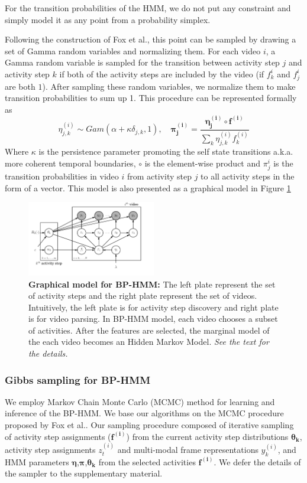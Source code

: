 For the transition probabilities of the HMM, we do not put any constraint and simply model it as any point from a probability simplex. 

Following the construction of Fox et al.\cite{foxBPHMM}, this point can be sampled by drawing a set of Gamma random variables and normalizing them. For each video $i$, a Gamma random variable is sampled for the transition between activity step $j$ and activity step $k$ if both of the activity steps are included by the video (\ie if $f^i_k$ and $f^i_j$ are both $1$). After sampling these random variables, we normalize them to make transition probabilities to sum up 1. This procedure can be represented formally as
\begin{equation}
  \eta_{j,k}^{(i)} \sim Gam(\alpha+\kappa \delta_{j,k},1), \quad \mathbf{\pi_j^{(i)}} = \frac{\mathbf{\eta^{(i)}_j} \circ \mathbf{f^{(i)}}}{\sum_k \eta^{(i)}_{j,k} f^{(i)}_k}
\end{equation}
Where $\kappa$ is the persistence parameter promoting the self state transitions a.k.a. more coherent temporal boundaries, $\circ$ is the element-wise product and $\pi^i_j$ is the transition probabilities in video $i$ from activity step $j$ to all activity steps in the form of a vector. This model is also presented as a graphical model in Figure \ref{bphmmo}
\begin{figure}[h!]
  \includegraphics[width=0.5\textwidth]{plate}
  \vspace{-8mm}
  \caption{\textbf{Graphical model for BP-HMM:} The left plate represent the set of activity steps and the right plate represent the set of videos. Intuitively, the left plate is for activity step discovery and right plate is for video parsing. In BP-HMM model, each video chooses a subset of activities. After the features are selected, the marginal model of the each video becomes an Hidden Markov Model. \emph{See the text for the details.}}
  \label{bphmmo}
\end{figure}


\subsubsection{Gibbs sampling for BP-HMM}
We employ Markov Chain Monte Carlo (MCMC) method for learning and inference of the BP-HMM. We base our algorithms on the MCMC procedure proposed by Fox et al.\cite{foxBPHMM}. Our sampling procedure composed of iterative sampling of activity step assignments ($\mathbf{f^{(i)}}$) from the current activity step distributions $\mathbf{\theta_k}$, activity step assignments $z^{(i)}_t$ and multi-modal frame representations $y^{(i)}_k$, and HMM parameters $\mathbf{\eta}$,$\mathbf{\pi}$,$\mathbf{\theta_k}$ from the selected activities $\mathbf{f^{(i)}}$. We defer the details of the sampler to the supplementary material.